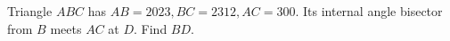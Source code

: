 Triangle $ ABC $ has $ AB=2023,BC=2312,AC=300 $. Its internal angle bisector from $ B $ meets $ AC $ at $ D $. Find $ BD $.
